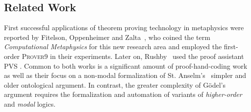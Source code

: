 \documentclass{llncs}
\newcommand{\logic}[1]{\textbf{#1}\xspace}
\newcommand{\SFiveU}{\logic{S5\textsuperscript{U}}}
\begin{document}



\subsection{Related Work}

First successful applications of theorem proving technology in
metaphysics were reported by Fitelson, Oppenheimer and
Zalta~\cite{FitelsonZalta,oppenheimer11}, who coined the term \textit{Computational Metaphysics} for this new research area and employed the first-order
\textsc{Prover9} \cite{prover9-mace4} in their experiments. Later on,
Rushby~\cite{rushby13} used the proof assistant \textsc{PVS} \cite{cade92-pvs}. Common to both
works is a significant amount of proof-hand-coding work as well as their
focus on a non-modal formalization of St. Anselm's~\cite{Proslogion} simpler 
and older ontological argument. In contrast, the greater complexity of G\"odel's argument requires the formalization and automation of variants of \emph{higher-order} and \emph{modal} logics.
\end{document}
